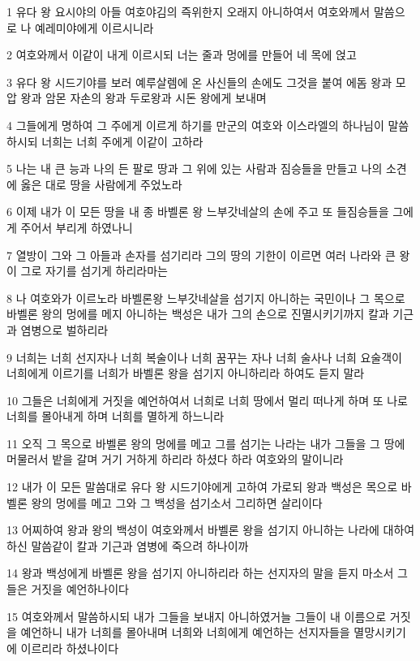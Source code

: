 \par 1 유다 왕 요시야의 아들 여호야김의 즉위한지 오래지 아니하여서 여호와께서 말씀으로 나 예레미야에게 이르시니라
\par 2 여호와께서 이같이 내게 이르시되 너는 줄과 멍에를 만들어 네 목에 얹고
\par 3 유다 왕 시드기야를 보러 예루살렘에 온 사신들의 손에도 그것을 붙여 에돔 왕과 모압 왕과 암몬 자손의 왕과 두로왕과 시돈 왕에게 보내며
\par 4 그들에게 명하여 그 주에게 이르게 하기를 만군의 여호와 이스라엘의 하나님이 말씀하시되 너희는 너희 주에게 이같이 고하라
\par 5 나는 내 큰 능과 나의 든 팔로 땅과 그 위에 있는 사람과 짐승들을 만들고 나의 소견에 옳은 대로 땅을 사람에게 주었노라
\par 6 이제 내가 이 모든 땅을 내 종 바벨론 왕 느부갓네살의 손에 주고 또 들짐승들을 그에게 주어서 부리게 하였나니
\par 7 열방이 그와 그 아들과 손자를 섬기리라 그의 땅의 기한이 이르면 여러 나라와 큰 왕이 그로 자기를 섬기게 하리라마는
\par 8 나 여호와가 이르노라 바벨론왕 느부갓네살을 섬기지 아니하는 국민이나 그 목으로 바벨론 왕의 멍에를 메지 아니하는 백성은 내가 그의 손으로 진멸시키기까지 칼과 기근과 염병으로 벌하리라
\par 9 너희는 너희 선지자나 너희 복술이나 너희 꿈꾸는 자나 너희 술사나 너희 요술객이 너희에게 이르기를 너희가 바벨론 왕을 섬기지 아니하리라 하여도 듣지 말라
\par 10 그들은 너희에게 거짓을 예언하여서 너희로 너희 땅에서 멀리 떠나게 하며 또 나로 너희를 몰아내게 하며 너희를 멸하게 하느니라
\par 11 오직 그 목으로 바벨론 왕의 멍에를 메고 그를 섬기는 나라는 내가 그들을 그 땅에 머물러서 밭을 갈며 거기 거하게 하리라 하셨다 하라 여호와의 말이니라
\par 12 내가 이 모든 말씀대로 유다 왕 시드기야에게 고하여 가로되 왕과 백성은 목으로 바벨론 왕의 멍에를 메고 그와 그 백성을 섬기소서 그리하면 살리이다
\par 13 어찌하여 왕과 왕의 백성이 여호와께서 바벨론 왕을 섬기지 아니하는 나라에 대하여 하신 말씀같이 칼과 기근과 염병에 죽으려 하나이까
\par 14 왕과 백성에게 바벨론 왕을 섬기지 아니하리라 하는 선지자의 말을 듣지 마소서 그들은 거짓을 예언하나이다
\par 15 여호와께서 말씀하시되 내가 그들을 보내지 아니하였거늘 그들이 내 이름으로 거짓을 예언하니 내가 너희를 몰아내며 너희와 너희에게 예언하는 선지자들을 멸망시키기에 이르리라 하셨나이다

